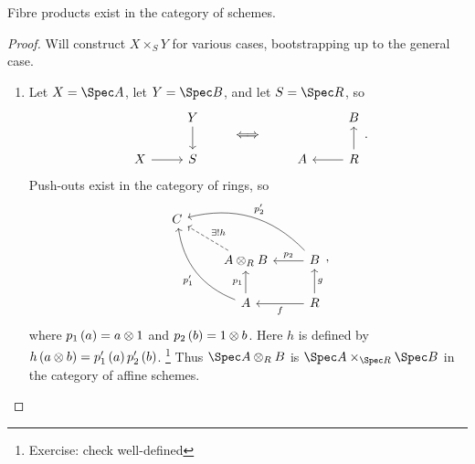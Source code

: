 
\begin{theorem}
Fibre products exist in the category of schemes.
\end{theorem}

\begin{proof}
Will construct $ X \times_S Y $ for various cases, bootstrapping up to the general case.
\begin{enumerate}[leftmargin=0.5in, label=Step \arabic*.]
\item Let $ X = \Spec A $, let $ Y = \Spec B $, and let $ S = \Spec R $, so
$$
\begin{tikzcd}
& Y \arrow{d} \\
X \arrow{r} & S
\end{tikzcd}
\qquad \iff \qquad
\begin{tikzcd}
& B \\
A & R \arrow{u} \arrow{l}
\end{tikzcd}.
$$
Push-outs exist in the category of rings, so
$$
\begin{tikzcd}
C & & \\
& A \otimes_R B \arrow[dashed]{ul}[swap]{\exists !h} & B \arrow[bend right=30]{ull}[swap]{p_2'} \arrow{l}[swap]{p_2} \\
& A \arrow[bend left=30]{uul}{p_1'} \arrow{u}{p_1} & R \arrow{u}[swap]{g} \arrow{l}{f}
\end{tikzcd},
$$
where $ p_1\br{a} = a \otimes 1 $ and $ p_2\br{b} = 1 \otimes b $. Here $ h $ is defined by $ h\br{a \otimes b} = p_1'\br{a}p_2'\br{b} $. \footnote{Exercise: check well-defined} Thus $ \Spec A \otimes_R B $ is $ \Spec A \times_{\Spec R} \Spec B $ in the category of affine schemes.

\pagebreak


\end{enumerate}
\end{proof}
